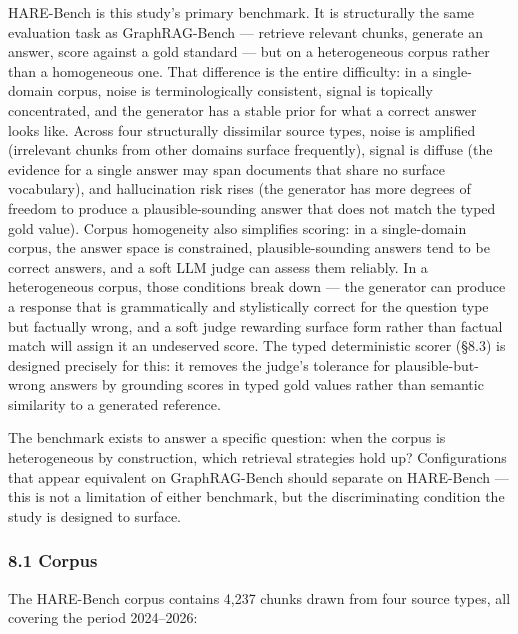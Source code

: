 HARE-Bench is this study's primary benchmark. It is structurally the same evaluation task as GraphRAG-Bench --- retrieve relevant chunks, generate an answer, score against a gold standard --- but on a heterogeneous corpus rather than a homogeneous one. That difference is the entire difficulty: in a single-domain corpus, noise is terminologically consistent, signal is topically concentrated, and the generator has a stable prior for what a correct answer looks like. Across four structurally dissimilar source types, noise is amplified (irrelevant chunks from other domains surface frequently), signal is diffuse (the evidence for a single answer may span documents that share no surface vocabulary), and hallucination risk rises (the generator has more degrees of freedom to produce a plausible-sounding answer that does not match the typed gold value). Corpus homogeneity also simplifies scoring: in a single-domain corpus, the answer space is constrained, plausible-sounding answers tend to be correct answers, and a soft LLM judge can assess them reliably. In a heterogeneous corpus, those conditions break down --- the generator can produce a response that is grammatically and stylistically correct for the question type but factually wrong, and a soft judge rewarding surface form rather than factual match will assign it an undeserved score. The typed deterministic scorer (§8.3) is designed precisely for this: it removes the judge's tolerance for plausible-but-wrong answers by grounding scores in typed gold values rather than semantic similarity to a generated reference.

The benchmark exists to answer a specific question: when the corpus is heterogeneous by construction, which retrieval strategies hold up? Configurations that appear equivalent on GraphRAG-Bench should separate on HARE-Bench --- this is not a limitation of either benchmark, but the discriminating condition the study is designed to surface.

\subsubsection{8.1 Corpus}\label{corpus}

The HARE-Bench corpus contains 4,237 chunks drawn from four source types, all covering the period 2024--2026:


